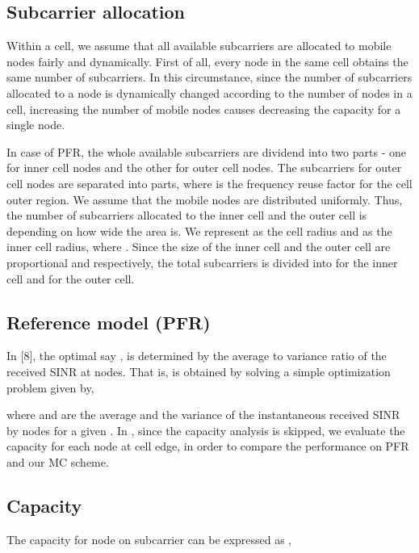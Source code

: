 \documentclass[conference]{IEEEtran}
\begin{document}
\subsection{Subcarrier allocation}

Within a cell, we assume that all available subcarriers are allocated to mobile nodes fairly and dynamically. First of all, every node in the same cell obtains the same number of subcarriers. In this circumstance, since the number of subcarriers allocated to a node is dynamically changed according to the number of nodes in a cell, increasing the number of mobile nodes causes decreasing the capacity for a single node.

In case of PFR, the whole available subcarriers are dividend into two parts - one for inner cell nodes and the other for outer cell nodes. The subcarriers for outer cell nodes are separated into  parts, where  is the frequency reuse factor for the cell outer region. We assume that the mobile nodes are distributed uniformly. Thus, the number of subcarriers allocated to the inner cell and the outer cell is depending on how wide the area is. We represent  as the cell radius and  as the inner cell radius, where . Since the size of the inner cell and the outer cell are proportional  and  respectively, the total subcarriers  is divided into  for the inner cell and  for the outer cell.

\subsection{Reference model (PFR)}
 In [8], the optimal  say , is determined by the average to variance ratio of the received SINR at nodes. That is,  is obtained by solving a simple optimization problem given by,




\noindent where  and  are the average and the variance of the instantaneous received SINR by nodes for a given . In \cite{Najjar}, since the capacity analysis is skipped, we evaluate the capacity for each node at cell edge, in order to compare the performance on PFR and our MC scheme.


\subsection{Capacity}

The capacity for node  on subcarrier  can be expressed as \cite{Shen},
\end{document}
